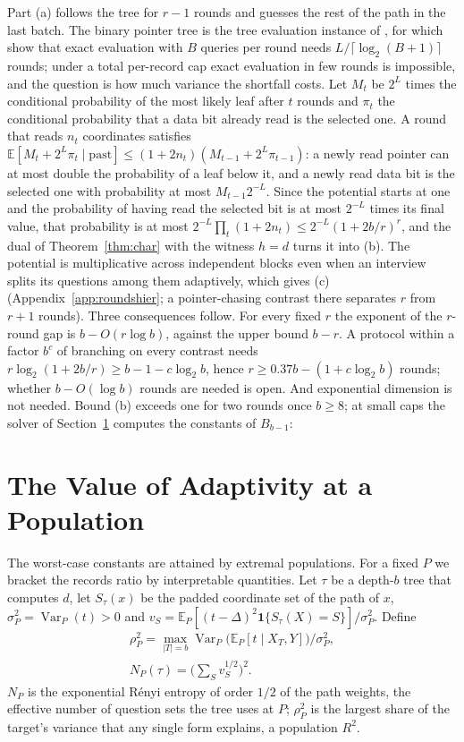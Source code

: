 \documentclass{article}
\newcommand{\E}{\mathbb{E}}
\newcommand{\Var}{\operatorname{Var}}
\begin{document}
Part (a) follows the tree for $r-1$ rounds and guesses the rest of the path in the last batch. The binary pointer tree is the tree evaluation instance of \citet{cook2012}, for which \citet{li2026regex} show that exact evaluation with $B$ queries per round needs $L/\lceil\log_2(B+1)\rceil$ rounds; under a total per-record cap exact evaluation in few rounds is impossible, and the question is how much variance the shortfall costs. Let $M_t$ be $2^{L}$ times the conditional probability of the most likely leaf after $t$ rounds and $\pi_t$ the conditional probability that a data bit already read is the selected one. A round that reads $n_t$ coordinates satisfies $\E[M_t+2^L\pi_t\mid\text{past}]\le(1+2n_t)(M_{t-1}+2^L\pi_{t-1})$: a newly read pointer can at most double the probability of a leaf below it, and a newly read data bit is the selected one with probability at most $M_{t-1}2^{-L}$. Since the potential starts at one and the probability of having read the selected bit is at most $2^{-L}$ times its final value, that probability is at most $2^{-L}\prod_t(1+2n_t)\le2^{-L}(1+2b/r)^r$, and the dual of Theorem~\ref{thm:char} with the witness $h=d$ turns it into (b). The potential is multiplicative across independent blocks even when an interview splits its questions among them adaptively, which gives (c) (Appendix~\ref{app:roundshier}; a pointer-chasing contrast there separates $r$ from $r+1$ rounds). Three consequences follow. For every fixed $r$ the exponent of the $r$-round gap is $b-O(r\log b)$, against the upper bound $b-r$. A protocol within a factor $b^c$ of branching on every contrast needs $r\log_2(1+2b/r)\ge b-1-c\log_2b$, hence $r\ge0.37b-(1+c\log_2b)$ rounds; whether $b-O(\log b)$ rounds are needed is open. And exponential dimension is not needed. Bound (b) exceeds one for two rounds once $b\ge8$; at small caps the solver of Section~\ref{sec:population} computes the constants of $B_{b-1}$: \nPointerSentence{}

\section{The Value of Adaptivity at a Population}\label{sec:population}
The worst-case constants are attained by extremal populations. For a fixed $P$ we bracket the records ratio by interpretable quantities. Let $\tau$ be a depth-$b$ tree that computes $d$, let $S_\tau(x)$ be the padded coordinate set of the path of $x$, $\sigma_P^2=\Var_P(t)>0$ and $v_S=\E_P[(t-\Delta)^2\mathbf 1\{S_\tau(X)=S\}]/\sigma_P^2$. Define
\begin{gather*}
 \rho_P^2=\max_{|T|=b}\Var_P\big(\E_P[t\mid X_T,Y]\big)\big/\sigma_P^2,\\
 N_P(\tau)=\Big(\sum\nolimits_Sv_S^{1/2}\Big)^2.
\end{gather*}
$N_P$ is the exponential R\'enyi entropy of order $1/2$ of the path weights, the effective number of question sets the tree uses at $P$; $\rho_P^2$ is the largest share of the target's variance that any single form explains, a population $R^2$.
\end{document}
